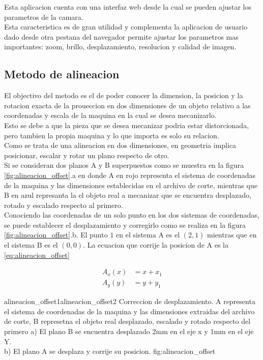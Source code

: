   Esta aplicacion cuenta con una interfaz web desde la cual se pueden ajustar los parametros de la camara.\\
  Esta caracteristica es de gran utilidad y complementa la aplicacion de usuario dado desde otra pestana del navegador permite ajustar los parametros mas importantes: zoom, brillo, desplazamiento, resolucion y calidad de imagen.\\


\subsection{Metodo de alineacion}
   El objectivo del metodo es el de poder conocer la dimension, la posicion y la rotacion exacta de la proueccion en dos dimensiones de un objeto relativo a las coordenadas y escala de la maquina en la cual se desea mecanizarlo. \\
Esto se debe a que la pieza que se desea mecanizar podria estar distorcionada, pero tambien la propia maquina y lo que importa es solo su relacion. \\
   Como se trata de una alineacion en dos dimensiones, en geometria implica posicionar, escalar y rotar un plano respecto de otro.\\
   Si se consideran dos planos A y B superpuestos como se muestra en la figura \ref{fig:alineacion_offset}.a en donde A en rojo representa el sistema de coordenadas de la maquina y las dimensiones establecidas en el archivo de corte, mientras que B en azul represanta la el objeto real a mecanizar que se encuentra desplazado, rotado y escalado respecto al primero. \\
   Conociendo las coordenadas de un solo punto en los dos sistemas de coordenadas, se puede establecer el desplazamiento y corregirlo como se realiza en la figura \ref{fig:alineacion_offset}.b. El punto $1$ en el sistema A es el $(2,1)$ mientras que en el sistema B es el $(0,0)$.
   La ecuacion que corrije la posicion de A es la \ref{eq:alineacion_offset}

   \begin{equation}
      \begin{aligned}
         A_x(x) &= x+x_1 \\
         A_y(y) &= y+y_1
      \end{aligned}
      \label{eq:alineacion_offset}
   \end{equation}

         {alineacion_offset1}{alineacion_offset2}
         {Correccion de desplazamiento. A representa el sistema de coordenadas de la maquina y las dimensiones extraidas del archivo de corte, B represetna el objeto real desplazado, escalado y rotado respecto del primero a) El plano B se encuentra desplazado 2mm en el eje x y 1mm en el eje Y.\\ b) El plano A se desplaza y corrije su posicion.}
         {fig:alineacion_offset}

